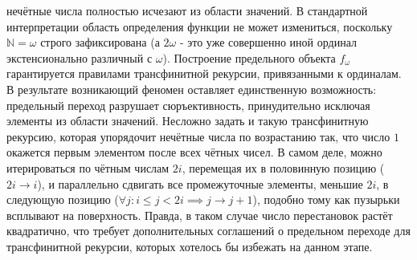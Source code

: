 \documentclass[12pt]{article}
\begin{document}
нечётные числа полностью исчезают из области значений. В стандартной интерпретации область определения функции не может измениться, поскольку $\mathbb{N} = \omega$ строго зафиксирована (а $2\omega$ - это уже совершенно иной ординал экстенсионально различный с $\omega$). Построение предельного объекта $f_\omega$ гарантируется правилами трансфинитной рекурсии, привязанными к ординалам. В результате возникающий феномен оставляет единственную возможность: предельный переход разрушает сюръективность, принудительно исключая элементы из области значений. Несложно задать и такую трансфинитную рекурсию, которая упорядочит нечётные числа по возрастанию так, что число $1$ окажется первым элементом после всех чётных чисел. В самом деле, можно итерироваться по чётным числам $2i$, перемещая их в половинную позицию ($2i \to i$), и параллельно сдвигать все промежуточные элементы, меньшие $2i$, в следующую позицию ($\forall j: i \le j < 2i \implies j \to j + 1$), подобно тому как пузырьки всплывают на поверхность. Правда, в таком случае число перестановок растёт квадратично, что требует дополнительных соглашений о предельном переходе для трансфинитной рекурсии, которых хотелось бы избежать на данном этапе.
\end{document}
